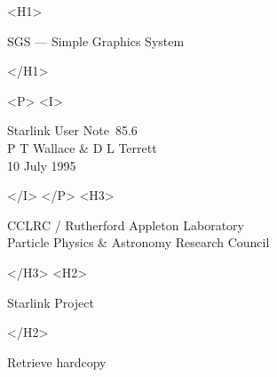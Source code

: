 \documentclass[11pt]{article}
\newcommand{\stardoccategory}  {Starlink User Note}
\newcommand{\stardocsource}    {sun85.6}
\newcommand{\stardocnumber}    {85.6}
\newcommand{\stardocauthors}   {P T Wallace \& D L Terrett}
\newcommand{\stardocdate}      {10 July 1995}
\newcommand{\stardoctitle}     {SGS --- Simple Graphics System}
\newcommand{\htmladdnormallink}[2]{#1}
\newcommand{\htmladdimg}[1]{}
\newcommand{\xlabel}[1]{}
\begin{document}
\begin{htmlonly}
   \xlabel{}
   \begin{rawhtml} <H1> \end{rawhtml}
      \stardoctitle
   \begin{rawhtml} </H1> \end{rawhtml}


   \begin{rawhtml} <P> <I> \end{rawhtml}
   \stardoccategory\ \stardocnumber \\
   \stardocauthors \\
   \stardocdate
   \begin{rawhtml} </I> </P> <H3> \end{rawhtml}
      \htmladdnormallink{CCLRC}{http://www.clrc.ac.uk} /
      \htmladdnormallink{Rutherford Appleton Laboratory}
                        {http://www.clrc.ac.uk/ral} \\
      Particle Physics \& Astronomy Research Council \\
   \begin{rawhtml} </H3> <H2> \end{rawhtml}
      \htmladdnormallink{Starlink Project}{http://www.starlink.ac.uk/}
   \begin{rawhtml} </H2> \end{rawhtml}
   \htmladdnormallink{\htmladdimg{source.gif} Retrieve hardcopy}
      {http://www.starlink.ac.uk/cgi-bin/hcserver?\stardocsource}\\


\end{htmlonly}
\end{document}
